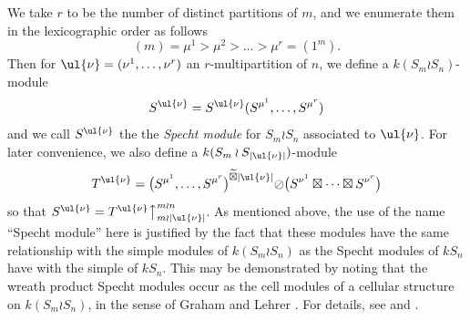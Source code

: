 We take $r$ to be the number of distinct partitions of $m$, and we enumerate them in the lexicographic order as follows
\[ (m) = \mu^1 > \mu^2 > \ldots > \mu^r = (1^m). \]
Then for $\ul{\nu}=(\nu^1,\ldots,\nu^r)$ an $r$-multipartition of $n$, we define a $k(S_m{\wr}S_n)$-module
\[
	S^{\ul{\nu}} =S^{\ul{\nu}}(S^{\mu^1},\ldots,S^{\mu^r})
\]
and we call $S^{\ul{\nu}}$ the the \textit{Specht module} for $S_m{\wr}S_n$ associated to $\ul{\nu}$. For later convenience, we also
define a $k(S_m \wr S_{|\ul{\nu}|})$-module
\[
	T^{\ul{\nu}} = \bigl(S^{\mu^1},\ldots,S^{\mu^r}\bigr)^{\widetilde\boxtimes |\ul{\nu}|}{\oslash}
	\bigl(S^{\nu^1}\boxtimes\cdots\boxtimes S^{\nu^r}\bigr)
\]
so that $S^{\ul{\nu}} = T^{\ul{\nu}}\bigr\uparrow^{m{\wr}n}_{m{\wr}|\ul{\nu}|}$.
As mentioned above, the use of the name ``Specht module'' here is justified by the fact that these modules have the same relationship
with the simple modules of $k(S_m \wr S_n)$ as the Specht modules of $kS_n$ have with the simple of $kS_n$. This may be demonstrated by
noting that the wreath product Specht modules occur as the cell modules of a cellular structure on $k(S_m \wr S_n)$, in the sense of
Graham and Lehrer \cite{GLCA}. For details, see \cite{GCSWPA} and \cite[Section 5.5]{PHDTHES}.

